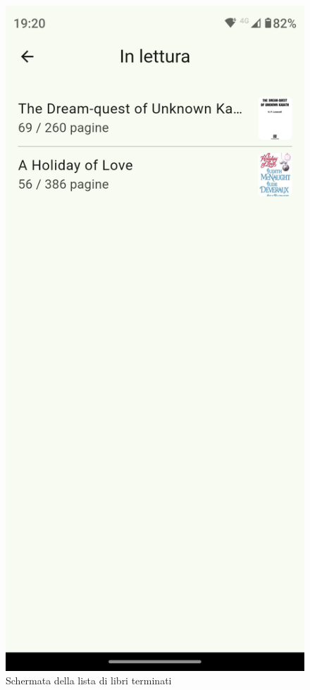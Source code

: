 \documentclass{article}
\begin{document}
\begin{figure}[H]
  \centering
  \includegraphics[width=0.6\linewidth]{reading-shelf-f.png}
  \caption{Schermata della lista di libri terminati}
  \label{fig:sitemap}
\end{figure}
\end{document}
